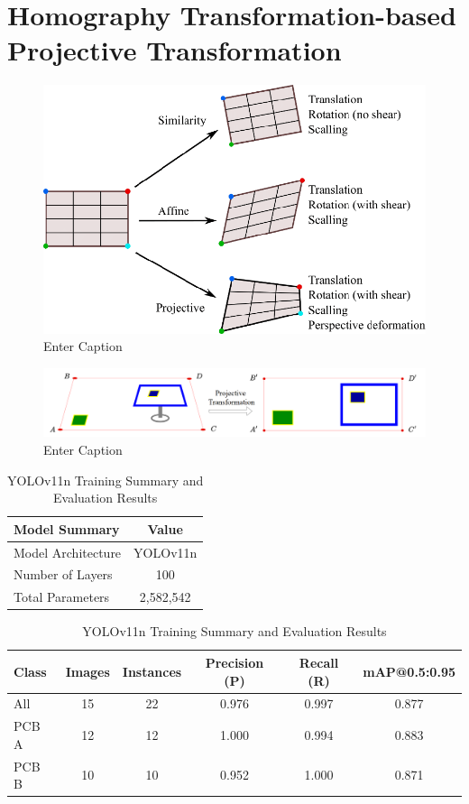 \documentclass{rithy-thesis}
\begin{document}
\section{Homography Transformation-based Projective Transformation}

\begin{figure}[H]
    \centering
    \includegraphics[width=0.75\linewidth]{figures/projective transform.png}
    \caption{Enter Caption}
    \label{fig:placeholder}
\end{figure}
\begin{figure}[H]
    \centering
    \includegraphics[width=1\linewidth]{figures/transformation.png}
    \caption{Enter Caption}
    \label{fig:placeholder}
\end{figure}

\begin{table}[H]
\renewcommand{\arraystretch}{1.25} %
\centering
\caption{YOLOv11n Training Summary and Evaluation Results}
\label{tab:param tran}
\begin{tabular}{|l|c|}
\hline
\textbf{Model Summary} & \textbf{Value} \\
\hline
Model Architecture     & YOLOv11n \\
Number of Layers       & 100 \\
Total Parameters       & 2,582,542 \\
\hline
\end{tabular}

\vspace{0.5cm}

\begin{tabular}{|l|c|c|c|c|c|}
\hline
\textbf{Class} & \textbf{Images} & \textbf{Instances} & \textbf{Precision (P)} & \textbf{Recall (R)} & \textbf{mAP@0.5:0.95} \\
\hline
All      & 15 & 22 & 0.976 & 0.997 & 0.877 \\
PCB A    & 12 & 12 & 1.000 & 0.994 & 0.883 \\
PCB B    & 10 & 10 & 0.952 & 1.000 & 0.871 \\
\hline
\end{tabular}
\end{table}
\end{document}

